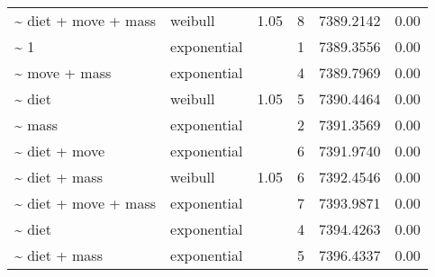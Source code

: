 \begin{table}[ht]
\begin{tabular}{llrrrr}
  \~{} diet + move + mass & weibull & 1.05 & 8 & 7389.2142 & 0.00 \\ 
  \~{} 1 & exponential &  & 1 & 7389.3556 & 0.00 \\ 
  \~{} move + mass & exponential &  & 4 & 7389.7969 & 0.00 \\ 
  \~{} diet & weibull & 1.05 & 5 & 7390.4464 & 0.00 \\ 
  \~{} mass & exponential &  & 2 & 7391.3569 & 0.00 \\ 
  \~{} diet + move & exponential &  & 6 & 7391.9740 & 0.00 \\ 
  \~{} diet + mass & weibull & 1.05 & 6 & 7392.4546 & 0.00 \\ 
  \~{} diet + move + mass & exponential &  & 7 & 7393.9871 & 0.00 \\ 
  \~{} diet & exponential &  & 4 & 7394.4263 & 0.00 \\ 
  \~{} diet + mass & exponential &  & 5 & 7396.4337 & 0.00 \\ 
  \end{tabular}
\label{tab:na}
\end{table}

